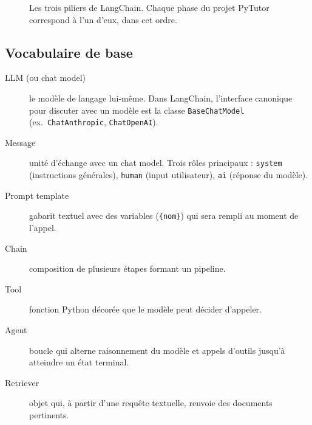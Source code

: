 \documentclass[11pt,a4paper]{article}
\begin{document}
\begin{figure}[h]
\centering
{}
\caption{Les trois piliers de LangChain. Chaque phase du projet PyTutor correspond à l'un d'eux, dans cet ordre.}
\end{figure}

\subsection{Vocabulaire de base}

\begin{description}
  \item[LLM (ou chat model)] le modèle de langage lui-même. Dans LangChain, l'interface canonique pour discuter avec un modèle est la classe \texttt{BaseChatModel} (ex.\ \texttt{ChatAnthropic}, \texttt{ChatOpenAI}).
  \item[Message] unité d'échange avec un chat model. Trois rôles principaux : \texttt{system} (instructions générales), \texttt{human} (input utilisateur), \texttt{ai} (réponse du modèle).
  \item[Prompt template] gabarit textuel avec des variables (\texttt{\{nom\}}) qui sera rempli au moment de l'appel.
  \item[Chain] composition de plusieurs étapes formant un pipeline.
  \item[Tool] fonction Python décorée que le modèle peut décider d'appeler.
  \item[Agent] boucle qui alterne raisonnement du modèle et appels d'outils jusqu'à atteindre un état terminal.
  \item[Retriever] objet qui, à partir d'une requête textuelle, renvoie des documents pertinents.
\end{description}
\end{document}
